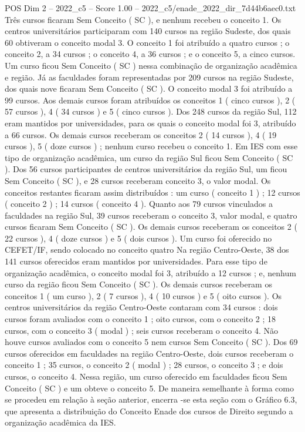 \begin{textsample}{POS Dim 2 – 2022\_c5 – Score 1.00 – 2022\_c5/enade\_2022\_dir\_7d44b6aec0.txt}
Três cursos ficaram Sem Conceito ( SC ), e nenhum recebeu o conceito 1.
Os centros universitários participaram com 140 cursos na região Sudeste, dos quais 60 obtiveram o conceito modal 3.
O conceito 1 foi atribuído a quatro cursos ; o conceito 2, a 34 cursos ; o conceito 4, a 36 cursos ; e o conceito 5, a cinco cursos.
Um curso ficou Sem Conceito ( SC ) nessa combinação de organização acadêmica e região.
Já as faculdades foram representadas por 209 cursos na região Sudeste, dos quais nove ficaram Sem Conceito ( SC ).
O conceito modal 3 foi atribuído a 99 cursos.
Aos demais cursos foram atribuídos os conceitos 1 ( cinco cursos ), 2 ( 57 cursos ), 4 ( 34 cursos ) e 5 ( cinco cursos ).
Dos 248 cursos da região Sul, 112 eram mantidos por universidades, para os quais o conceito modal foi 3, atribuído a 66 cursos.
Os demais cursos receberam os conceitos 2 ( 14 cursos ), 4 ( 19 cursos ), 5 ( doze cursos ) ; nenhum curso recebeu o conceito 1.
Em IES com esse tipo de organização acadêmica, um curso da região Sul ficou Sem Conceito ( SC ).
Dos 56 cursos participantes de centros universitários da região Sul, um ficou Sem Conceito ( SC ), e 28 cursos receberam conceito 3, o valor modal.
Os conceitos restantes ficaram assim distribuídos : um curso ( conceito 1 ) ; 12 cursos ( conceito 2 ) ; 14 cursos ( conceito 4 ).
Quanto aos 79 cursos vinculados a faculdades na região Sul, 39 cursos receberam o conceito 3, valor modal, e quatro cursos ficaram Sem Conceito ( SC ).
Os demais cursos receberam os conceitos 2 ( 22 cursos ), 4 ( doze cursos ) e 5 ( dois cursos ).
Um curso foi oferecido no CEFET/IF, sendo colocado no conceito quatro Na região Centro-Oeste, 38 dos 141 cursos oferecidos eram mantidos por universidades.
Para esse tipo de organização acadêmica, o conceito modal foi 3, atribuído a 12 cursos ; e, nenhum curso da região ficou Sem Conceito ( SC ).
Os demais cursos receberam os conceitos 1 ( um curso ), 2 ( 7 cursos ), 4 ( 10 cursos ) e 5 ( oito cursos ).
Os centros universitários da região Centro-Oeste contaram com 34 cursos : dois cursos foram avaliados com o conceito 1 ; oito cursos, com o conceito 2 ; 18 cursos, com o conceito 3 ( modal ) ; seis cursos receberam o conceito 4.
Não houve cursos avaliados com o conceito 5 nem cursos Sem Conceito ( SC ).
Dos 69 cursos oferecidos em faculdades na região Centro-Oeste, dois cursos receberam o conceito 1 ; 35 cursos, o conceito 2 ( modal ) ; 28 cursos, o conceito 3 ; e dois cursos, o conceito 4.
Nessa região, um curso oferecido em faculdades ficou Sem Conceito ( SC ) e um obteve o conceito 5.
De maneira semelhante à forma como se procedeu em relação à seção anterior, encerra -se esta seção com o Gráfico 6.3, que apresenta a distribuição do Conceito Enade dos cursos de Direito segundo a organização acadêmica da IES.

\end{textsample}
